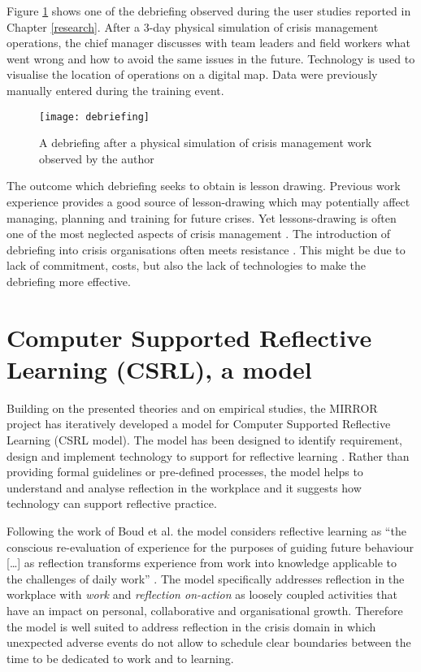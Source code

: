 Figure \ref{fig:debriefing-example} shows one of the debriefing observed during the user studies reported in Chapter \ref{research}. After a 3-day physical simulation of crisis management operations, the chief manager discusses with team leaders and field workers what went wrong and how to avoid the same issues in the future. Technology is used to visualise the location of operations on a digital map. Data were previously manually entered during the training event.

\begin{figure}
	[tbp] \centering 
	\texttt{[image: debriefing]} \caption{A debriefing after a physical simulation of crisis management work observed by the author} \label{fig:debriefing-example} 
\end{figure}

The outcome which debriefing seeks to obtain is lesson drawing. Previous work experience provides a good source of lesson-drawing which may potentially affect managing, planning and training for future crises. Yet lessons-drawing is often one of the most neglected aspects of crisis management \autocites{Lagadec:1997js}{Stern:1997eb}. The introduction of debriefing into crisis organisations often meets resistance \autocite{Lagadec:1997js}. This might be due to lack of commitment, costs, but also the lack of technologies to make the debriefing more effective.

\section{Computer Supported Reflective Learning (CSRL), a model}\label{computer-supported-reflective-learning-a-model}

Building on the presented theories and on empirical studies, the MIRROR project has iteratively developed a model for Computer Supported Reflective Learning (CSRL model). The model has been designed to identify requirement, design and implement technology to support for reflective learning \autocite{Krogstie:2013kf}. Rather than providing formal guidelines or pre-defined processes, the model helps to understand and analyse reflection in the workplace and it suggests how technology can support reflective practice.

Following the work of Boud et al. \autocite*{boud1985reflection} the model considers reflective learning as ``the conscious re-evaluation of experience for the purposes of guiding future behaviour {[}\ldots{}{]} as reflection transforms experience from work into knowledge applicable to the challenges of daily work'' \autocite{Krogstie:2013kf}. The model specifically addresses reflection in the workplace with \emph{work} and \emph{reflection on-action} as loosely coupled activities that have an impact on personal, collaborative and organisational growth. Therefore the model is well suited to address reflection in the crisis domain in which unexpected adverse events do not allow to schedule clear boundaries between the time to be dedicated to work and to learning.

